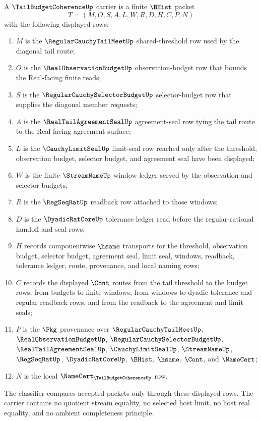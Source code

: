 \begin{definition}
\label{def:tail-budget-coherence-carrier}
A $\TailBudgetCoherenceUp$ carrier is a finite $\BHist$ packet
$$
T=(M,O,S,A,L,W,R,D,H,C,P,N)
$$
with the following displayed rows:
\begin{enumerate}
\item $M$ is the $\RegularCauchyTailMeetUp$ shared-threshold row used by the diagonal tail route;
\item $O$ is the $\RealObservationBudgetUp$ observation-budget row that bounds the Real-facing finite reads;
\item $S$ is the $\RegularCauchySelectorBudgetUp$ selector-budget row that supplies the diagonal member requests;
\item $A$ is the $\RealTailAgreementSealUp$ agreement-seal row tying the tail route to the Real-facing agreement surface;
\item $L$ is the $\CauchyLimitSealUp$ limit-seal row reached only after the threshold, observation budget, selector budget, and agreement seal have been displayed;
\item $W$ is the finite $\StreamNameUp$ window ledger served by the observation and selector budgets;
\item $R$ is the $\RegSeqRatUp$ readback row attached to those windows;
\item $D$ is the $\DyadicRatCoreUp$ tolerance ledger read before the regular-rational handoff and seal rows;
\item $H$ records componentwise $\hsame$ transports for the threshold, observation budget, selector budget, agreement seal, limit seal, windows, readback, tolerance ledger, route, provenance, and local naming rows;
\item $C$ records the displayed $\Cont$ routes from the tail threshold to the budget rows, from budgets to finite windows, from windows to dyadic tolerance and regular readback rows, and from the readback to the agreement and limit seals;
\item $P$ is the $\Pkg$ provenance over $\RegularCauchyTailMeetUp$, $\RealObservationBudgetUp$, $\RegularCauchySelectorBudgetUp$, $\RealTailAgreementSealUp$, $\CauchyLimitSealUp$, $\StreamNameUp$, $\RegSeqRatUp$, $\DyadicRatCoreUp$, $\BHist$, $\hsame$, $\Cont$, and $\NameCert$;
\item $N$ is the local $\NameCert_{\TailBudgetCoherenceUp}$ row.
\end{enumerate}
The classifier compares accepted packets only through these displayed rows. The carrier contains no quotient stream equality, no selected host limit, no host real equality, and no ambient completeness principle.
\end{definition}

